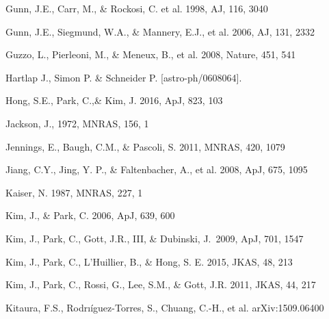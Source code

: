 \documentclass[useAMS,usenatbib]{mnras}
\begin{document}
\begin{thebibliography}{}




Gunn, J.E., Carr, M., \& Rockosi, C. et al. 1998, AJ, 116, 3040

Gunn, J.E., Siegmund, W.A., \& Mannery, E.J., et al. 2006, AJ, 131, 2332

Guzzo, L., Pierleoni, M., \& Meneux, B., et al. 2008, Nature, 451, 541

Hartlap J., Simon P. \& Schneider P. [astro-ph/0608064].


Hong, S.E., Park, C.,\&  Kim, J. 2016, ApJ, 823, 103

Jackson, J., 1972, MNRAS, 156, 1

Jennings, E., Baugh, C.M., \& Pascoli, S. 2011, MNRAS, 420, 1079  


Jiang, C.Y., Jing, Y. P., \& Faltenbacher, A., et al. 2008, ApJ, 675, 1095

Kaiser, N. 1987, MNRAS, 227, 1


Kim, J., \& Park, C. 2006, ApJ, 639, 600  

Kim, J., Park, C., Gott, J.R., III, \& Dubinski, J.\ 2009, ApJ, 701, 1547 

Kim, J., Park, C., L'Huillier, B., \& Hong, S. E. 2015, JKAS, 48, 213

Kim, J., Park, C., Rossi, G., Lee, S.M., \& Gott, J.R. 2011, JKAS, 44, 217  

Kitaura, F.S., Rodrı\'{i}guez-Torres, S., Chuang, C.-H., et al. arXiv:1509.06400


\end{thebibliography}
\end{document}
